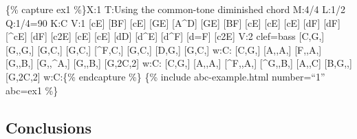 \documentclass{book}
\begin{document}
\{\% capture ex1 \%\}X:1 T:Using the common-tone diminished chord M:4/4 L:1/2
Q:1/4=90 K:C V:1 {[}cE{]} {[}BF{]}\textbar{} {[}cE{]} {[}GE{]}\textbar{}
{[}A\^{}D{]} {[}GE{]}\textbar{} {[}BF{]} {[}cE{]}\textbar{]} {[}cE{]}
{[}cE{]}\textbar{} {[}dF{]} {[}dF{]}\textbar{} {[}\^{}cE{]} {[}dF{]}\textbar{}
{[}c2E{]}\textbar{]} {[}cE{]} {[}cE{]}\textbar{} {[}dD{]}
{[}d\^{}E{]}\textbar{} {[}d\^{}F{]} {[}d=F{]}\textbar{} {[}c2E{]}\textbar{]}
V:2 clef=bass {[}C,G,{]} {[}G,,G,{]}\textbar{} {[}G,C,{]} {[}G,C,{]}\textbar{}
{[}\^{}F,C,{]} {[}G,C,{]}\textbar{} {[}D,G,{]} {[}G,C,{]}\textbar{]} w:C:
{[}C,G,{]} {[}A,,A,{]}\textbar{} {[}F,,A,{]} {[}G,,B,{]}\textbar{}
{[}G,,\^{}A,{]} {[}G,,B,{]}\textbar{} {[}G,2C,2{]}\textbar{]} w:C: {[}C,G,{]}
{[}A,,A,{]}\textbar{} {[}\^{}F,,A,{]} {[}\^{}G,,B,{]}\textbar{} {[}A,,C{]}
{[}B,G,,{]}\textbar{} {[}G,2C,2{]}\textbar{]} w:C:\{\% endcapture \%\} \{\%
include abc-example.html number=``1'' abc=ex1 \%\}

\hypertarget{conclusions-29}{%
\subsection{Conclusions}\label{conclusions-29}}
\end{document}
